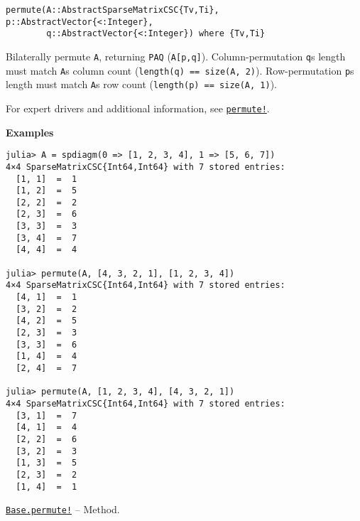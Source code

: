 \begin{adjustwidth}{2em}{0pt}


\begin{verbatim}
permute(A::AbstractSparseMatrixCSC{Tv,Ti}, p::AbstractVector{<:Integer},
        q::AbstractVector{<:Integer}) where {Tv,Ti}
\end{verbatim}

Bilaterally permute \texttt{A}, returning \texttt{PAQ} (\texttt{A[p,q]}). Column-permutation \texttt{q}{\textquotesingle}s length must match \texttt{A}{\textquotesingle}s column count (\texttt{length(q) == size(A, 2)}). Row-permutation \texttt{p}{\textquotesingle}s length must match \texttt{A}{\textquotesingle}s row count (\texttt{length(p) == size(A, 1)}).

For expert drivers and additional information, see \hyperlink{17157632988142440888}{\texttt{permute!}}.

\textbf{Examples}


\begin{verbatim}
julia> A = spdiagm(0 => [1, 2, 3, 4], 1 => [5, 6, 7])
4×4 SparseMatrixCSC{Int64,Int64} with 7 stored entries:
  [1, 1]  =  1
  [1, 2]  =  5
  [2, 2]  =  2
  [2, 3]  =  6
  [3, 3]  =  3
  [3, 4]  =  7
  [4, 4]  =  4

julia> permute(A, [4, 3, 2, 1], [1, 2, 3, 4])
4×4 SparseMatrixCSC{Int64,Int64} with 7 stored entries:
  [4, 1]  =  1
  [3, 2]  =  2
  [4, 2]  =  5
  [2, 3]  =  3
  [3, 3]  =  6
  [1, 4]  =  4
  [2, 4]  =  7

julia> permute(A, [1, 2, 3, 4], [4, 3, 2, 1])
4×4 SparseMatrixCSC{Int64,Int64} with 7 stored entries:
  [3, 1]  =  7
  [4, 1]  =  4
  [2, 2]  =  6
  [3, 2]  =  3
  [1, 3]  =  5
  [2, 3]  =  2
  [1, 4]  =  1
\end{verbatim}



\end{adjustwidth}
\hypertarget{10817887949404037920}{} 
\hyperlink{10817887949404037920}{\texttt{Base.permute!}}  -- {Method.}

